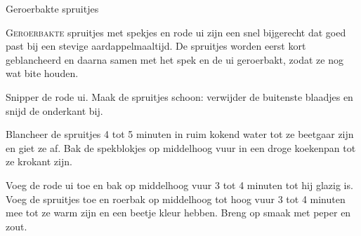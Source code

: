 \begin{recipe}{Geroerbakte spruitjes}


\lettrine{G}{eroerbakte} spruitjes met spekjes en rode ui zijn een snel
bijgerecht dat goed past bij een stevige aardappelmaaltijd. De spruitjes
worden eerst kort geblancheerd en daarna samen met het spek en de ui
geroerbakt, zodat ze nog wat bite houden.

\begin{ingredients}
\end{ingredients}

\begin{steps}
  \item Snipper de rode ui. Maak de spruitjes schoon: verwijder de buitenste
        blaadjes en snijd de onderkant bij.
  \item Blancheer de spruitjes 4 tot 5 minuten in ruim kokend water tot ze
        beetgaar zijn en giet ze af. Bak de spekblokjes op middelhoog vuur
        in een droge koekenpan tot ze krokant zijn.
  \item Voeg de rode ui toe en bak op middelhoog vuur 3 tot 4 minuten tot
        hij glazig is. Voeg de spruitjes toe en roerbak op middelhoog tot
        hoog vuur 3 tot 4 minuten mee tot ze warm zijn en een beetje kleur
        hebben. Breng op smaak met peper en zout.
\end{steps}

\end{recipe}
